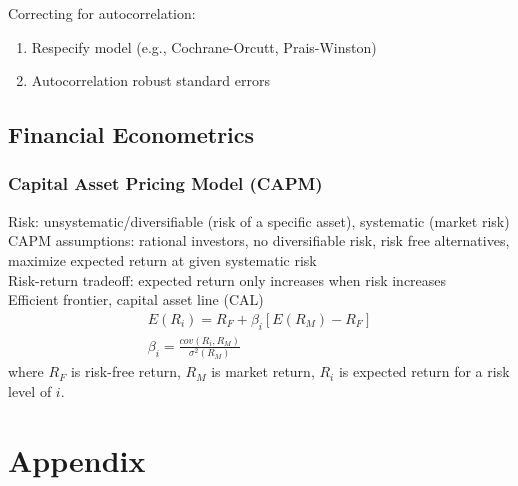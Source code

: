 \documentclass[12pt]{article}
\numberwithin{equation}{section}
\begin{document}
Correcting for autocorrelation:
\begin{enumerate}
    \item Respecify model (e.g., Cochrane-Orcutt, Prais-Winston)
    \item Autocorrelation robust standard errors
\end{enumerate}

\subsection{Financial Econometrics}

\subsubsection{Capital Asset Pricing Model (CAPM)}
Risk: unsystematic/diversifiable (risk of a specific asset), systematic (market risk) \\
CAPM assumptions: rational investors, no diversifiable risk, risk free alternatives, maximize expected return at given systematic risk \\
Risk-return tradeoff: expected return only increases when risk increases \\

Efficient frontier, capital asset line (CAL)
\begin{gather}
    E(R_i) = R_F + \beta_i [E(R_M)-R_F] \\
    \beta_i = \frac{cov(R_i,R_M)}{\sigma^2(R_M)}
\end{gather}
where $R_F$ is risk-free return, $R_M$ is market return, $R_i$ is expected return for a risk level of $i$.

\section{Appendix}
\label{sec:appendix}
\end{document}
